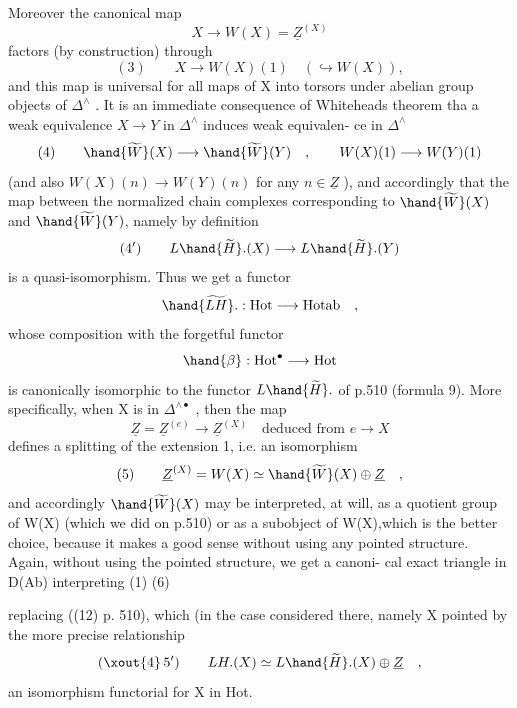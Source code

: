 
Moreover the canonical map
\[ X \longrightarrow W(X) = \underline{Z}^{(X)} \]
factors (by construction) through
\[ (3) \qquad X \longrightarrow W(X)(1) \quad ( \hookrightarrow W(X) ) , \]
and this map is universal for all maps of X into torsors under abelian
group objects of $\Delta^{\wedge}$ . It is an immediate consequence of Whiteheads
theorem tha a weak equivalence $X \to Y$ in $\Delta^{\wedge}$ induces  weak equivalen-%
ce in $\Delta^{\wedge}$
\[ (4) \qquad \hand{\widetilde{W}}(X) \longrightarrow \hand{\widetilde{W}}(Y) \quad , \qquad W(X)(1) \longrightarrow W(Y)(1) \]
(and also $W(X)(n) \to W(Y)(n)$ for any $n \in \underline{Z}$ ), and accordingly that
the map between the normalized chain complexes corresponding to $\hand{\widetilde{W}}(X)$ and
$\hand{\widetilde{W}}(Y)$, namely by definition
\[ (4') \qquad L\hand{\widetilde{H}}.(X) \longrightarrow L\hand{\widetilde{H}}.(Y) \]
is a quasi-isomorphism. Thus we get  a functor
\[ \hand{\widetilde{LH}}. : \mathrm{Hot} \longrightarrow \mathrm{Hotab} \quad , \]
whose composition with the forgetful functor
\[ \hand{\beta} : \mathrm{Hot}^{\bullet} \longrightarrow \mathrm{Hot} \]
is  canonically isomorphic to the functor $L\hand{\widetilde{H}}.$ of p.510 (formula
9). More specifically, when X is in $\Delta^{\wedge\bullet}$ , then the map
\[ \underline{Z} = \underline{Z}^{(e)} \longrightarrow \underline{Z}^{(X)} \quad \text{deduced from } e \to X \]
defines a splitting of the extension 1, i.e. an isomorphism
\[ (5) \qquad \underline{Z}^{(X)} = W(X) \simeq \hand{\widetilde{W}}(X) \oplus \underline{Z} \quad , \]
and accordingly $\hand{\widetilde{W}}(X)$ may be interpreted, at will, as a quotient group
of W(X) (which we did on p.510)\hand{,} or as a subobject of W(X),\deleted{(}which is the
better choice, because it makes a good sense without using any pointed
structure. Again, without using the pointed structure, we get a canoni-%
cal exact triangle in D(Ab) interpreting (1)
(6)

replacing ((12) p. 510), which  (in the case considered
there, namely X pointed\hand{)}  by the more precise relationship
\[ (\xout{4}\, 5') \qquad LH.(X) \simeq L\hand{\widetilde{H}}.(X) \oplus \underline{Z} \quad , \]
an isomorphism functorial for X in Hot\hand{$^{\bullet}$}.

